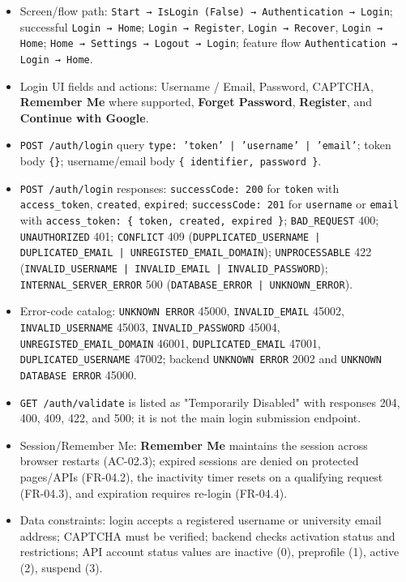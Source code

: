 \documentclass[12pt]{article}
\begin{document}
\begin{itemize}
\item Screen/flow path: \texttt{Start → IsLogin (False) → Authentication → Login}; successful \texttt{Login → Home}; \texttt{Login → Register}, \texttt{Login → Recover}, \texttt{Login → Home}; \texttt{Home → Settings → Logout → Login}; feature flow \texttt{Authentication → Login → Home}.
\item Login UI fields and actions: Username / Email, Password, CAPTCHA, \textbf{Remember Me} where supported, \textbf{Forget Password}, \textbf{Register}, and \textbf{Continue with Google}.
\item \texttt{POST /auth/login} query \texttt{type: 'token' | 'username' | 'email'}; token body \texttt{\{\}}; username/email body \texttt{\{ identifier, password \}}.
\item \texttt{POST /auth/login} responses: \texttt{successCode: 200} for \texttt{token} with \texttt{access\_token}, \texttt{created}, \texttt{expired}; \texttt{successCode: 201} for \texttt{username} or \texttt{email} with \texttt{access\_token: \{ token, created, expired \}}; \texttt{BAD\_REQUEST} 400; \texttt{UNAUTHORIZED} 401; \texttt{CONFLICT} 409 (\texttt{DUPPLICATED\_USERNAME | DUPLICATED\_EMAIL | UNREGISTED\_EMAIL\_DOMAIN}); \texttt{UNPROCESSABLE} 422 (\texttt{INVALID\_USERNAME | INVALID\_EMAIL | INVALID\_PASSWORD}); \texttt{INTERNAL\_SERVER\_ERROR} 500 (\texttt{DATABASE\_ERROR | UNKNOWN\_ERROR}).
\item Error-code catalog: \texttt{UNKNOWN ERROR} 45000, \texttt{INVALID\_EMAIL} 45002, \texttt{INVALID\_USERNAME} 45003, \texttt{INVALID\_PASSWORD} 45004, \texttt{UNREGISTED\_EMAIL\_DOMAIN} 46001, \texttt{DUPLICATED\_EMAIL} 47001, \texttt{DUPLICATED\_USERNAME} 47002; backend \texttt{UNKNOWN ERROR} 2002 and \texttt{UNKNOWN DATABASE ERROR} 45000.
\item \texttt{GET /auth/validate} is listed as "Temporarily Disabled" with responses 204, 400, 409, 422, and 500; it is not the main login submission endpoint.
\item Session/Remember Me: \textbf{Remember Me} maintains the session across browser restarts (AC-02.3); expired sessions are denied on protected pages/APIs (FR-04.2), the inactivity timer resets on a qualifying request (FR-04.3), and expiration requires re-login (FR-04.4).
\item Data constraints: login accepts a registered username or university email address; CAPTCHA must be verified; backend checks activation status and restrictions; API account status values are inactive (0), preprofile (1), active (2), suspend (3).
\end{itemize}
\par\medskip
\end{document}
